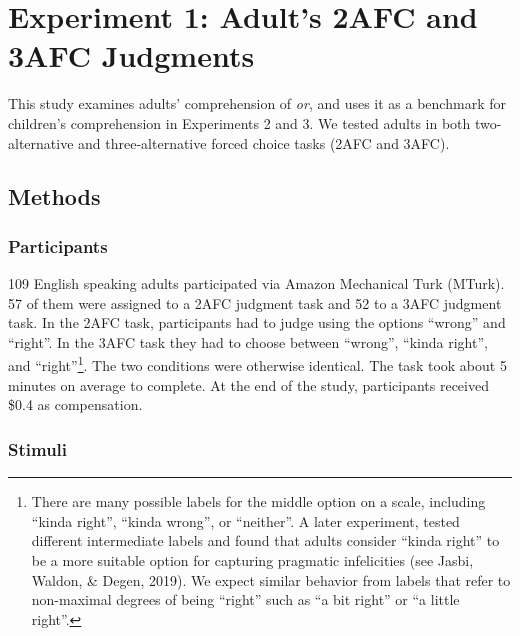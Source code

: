 \documentclass[,man,floatsintext]{apa6}
\let\rmarkdownfootnote\footnote%
\def\footnote{\protect\rmarkdownfootnote}
\begin{document}
\hypertarget{study1}{%
\section{Experiment 1: Adult's 2AFC and 3AFC Judgments}\label{study1}}

This study examines adults' comprehension of \emph{or}, and uses it as a benchmark for children's comprehension in Experiments 2 and 3. We tested adults in both two-alternative and three-alternative forced choice tasks (2AFC and 3AFC).

\hypertarget{methods}{%
\subsection{Methods}\label{methods}}

\hypertarget{participants}{%
\subsubsection{Participants}\label{participants}}

109 English speaking adults participated via Amazon Mechanical Turk (MTurk). 57 of them were assigned to a 2AFC judgment task and 52 to a 3AFC judgment task. In the 2AFC task, participants had to judge using the options \enquote{wrong} and \enquote{right}. In the 3AFC task they had to choose between \enquote{wrong}, \enquote{kinda right}, and \enquote{right}\footnote{There are many possible labels for the middle option on a scale, including \enquote{kinda right}, \enquote{kinda wrong}, or \enquote{neither}. A later experiment, tested different intermediate labels and found that adults consider \enquote{kinda right} to be a more suitable option for capturing pragmatic infelicities (see Jasbi, Waldon, \& Degen, 2019). We expect similar behavior from labels that refer to non-maximal degrees of being \enquote{right} such as \enquote{a bit right} or \enquote{a little right}.}. The two conditions were otherwise identical. The task took about 5 minutes on average to complete. At the end of the study, participants received \$0.4 as compensation.

\hypertarget{stimuli}{%
\subsubsection{Stimuli}\label{stimuli}}
\end{document}
